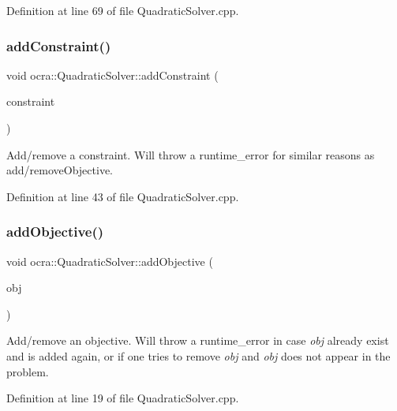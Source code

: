 Definition at line 69 of file Quadratic\+Solver.\+cpp.

\hypertarget{classocra_1_1QuadraticSolver_a0cf6c866db56031b48a447aa310bad94}{}\label{classocra_1_1QuadraticSolver_a0cf6c866db56031b48a447aa310bad94} 
\subsubsection{\texorpdfstring{add\+Constraint()}{addConstraint()}}
{\footnotesize\ttfamily void ocra\+::\+Quadratic\+Solver\+::add\+Constraint (\begin{DoxyParamCaption}\item[{\hyperlink{namespaceocra_ae8b87cf4099be3efc3b410019ad2046e}{Linear\+Constraint} \&}]{constraint }\end{DoxyParamCaption})}

Add/remove a constraint. Will throw a runtime\+\_\+error for similar reasons as add/remove\+Objective. 

Definition at line 43 of file Quadratic\+Solver.\+cpp.

\hypertarget{classocra_1_1QuadraticSolver_af8e4dba5faceb48ae3c355bd7fcf7073}{}\label{classocra_1_1QuadraticSolver_af8e4dba5faceb48ae3c355bd7fcf7073} 
\subsubsection{\texorpdfstring{add\+Objective()}{addObjective()}}
{\footnotesize\ttfamily void ocra\+::\+Quadratic\+Solver\+::add\+Objective (\begin{DoxyParamCaption}\item[{\hyperlink{namespaceocra_a0b50673710f087c0f1733aefd1a8e0f7}{Quadratic\+Objective} \&}]{obj }\end{DoxyParamCaption})}

Add/remove an objective. Will throw a runtime\+\_\+error in case {\itshape obj} already exist and is added again, or if one tries to remove {\itshape obj} and {\itshape obj} does not appear in the problem. 

Definition at line 19 of file Quadratic\+Solver.\+cpp.

